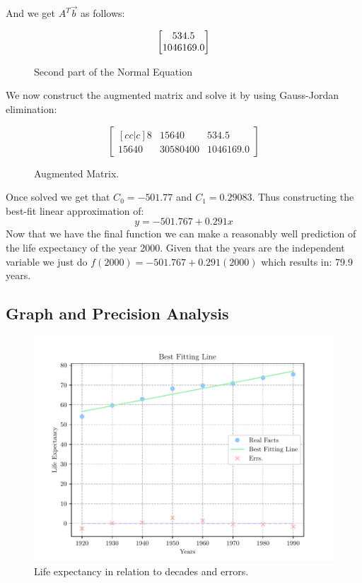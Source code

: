 \documentclass[letterpaper, conference]{IEEEtran}
\begin{document}
			And we get $A^T\vec{b}$ as follows:
			\begin{figure}[H]
				\centering
				\[
				\centering
				\left[
				\begin{matrix}
				534.5\\
				1046169.0
				\end{matrix}
				\right]
				\]
				\caption{Second part of the Normal Equation}
				\label{ATb_1}
			\end{figure}
		 
		 We now construct the augmented matrix and solve it by using Gauss-Jordan elimination:
		 \begin{figure}[H]
			\centering
			\[
			\begin{bmatrix}[c c|c ]
				8 & 15640 		 &				534.5\\
				15640 & 30580400 &				1046169.0
			\end{bmatrix}
			\]
			\caption{Augmented Matrix.}
			\label{ATAB_1 Augemented}
		 \end{figure}
	 
	 Once solved we get that $C_{0}=-501.77$ and 
	 $C_{1}=0.29083$. Thus constructing the best-fit linear approximation of:
	 \begin{equation}
	 	y = -501.767 + 0.291x
	 	\label{Exercise One Final Equation}
	 \end{equation}
	 Now that we have the final function we can make a reasonably well prediction of the life expectancy of the year 2000. Given that the years are the independent variable we just do $f(2000)= -501.767 + 0.291(2000)$ which results in: 79.9 years.
	 
	\subsection{Graph and Precision Analysis}
	\begin{figure}[H]
		\centering \includegraphics[scale=0.5]{../Graph_1.pdf}
		\caption{Life expectancy in relation to decades and errors.}
		\label{image1}
	\end{figure}
	
\end{document}
